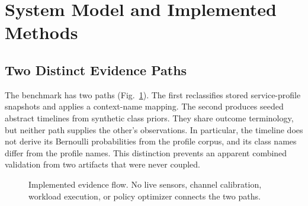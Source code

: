 \section{System Model and Implemented Methods}
\label{sec:method}
\subsection{Two Distinct Evidence Paths}
The benchmark has two paths (Fig.~\ref{fig:architecture}). The first reclassifies stored service-profile snapshots and applies a context-name mapping. The second produces seeded abstract timelines from synthetic class priors. They share outcome terminology, but neither path supplies the other's observations. In particular, the timeline does not derive its Bernoulli probabilities from the profile corpus, and its class names differ from the profile names. This distinction prevents an apparent combined validation from two artifacts that were never coupled.

\begin{figure}[t]
\centering
{}
\caption{Implemented evidence flow. No live sensors, channel calibration, workload execution, or policy optimizer connects the two paths.}\label{fig:architecture}
\end{figure}

